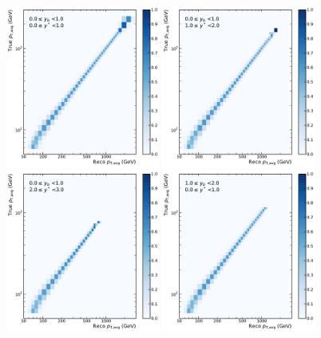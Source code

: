 \begin{figure}[htp]
    \centering
    \includegraphics[width=0.45\textwidth]{figures/measurement/res_matrix_ptavg_normalized_yb0ys0.pdf}\hfill
    \includegraphics[width=0.45\textwidth]{figures/measurement/res_matrix_ptavg_normalized_yb0ys1.pdf}
    \includegraphics[width=0.45\textwidth]{figures/measurement/res_matrix_ptavg_normalized_yb0ys2.pdf}\hfill
    \includegraphics[width=0.45\textwidth]{figures/measurement/res_matrix_ptavg_normalized_yb1ys0.pdf}

\end{figure}
